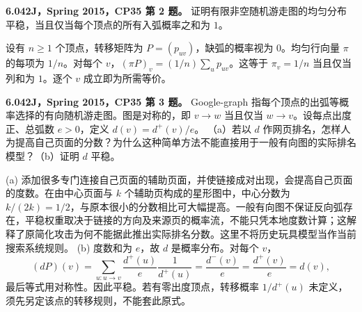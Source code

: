 \begin{exercise}\label{mit:6042-cp35-q2}
\textbf{6.042J，Spring 2015，CP35 第 2 题。}
证明有限非空随机游走图的均匀分布平稳，当且仅当每个顶点的所有入弧概率之和为 $1$。
\end{exercise}
\begin{solution}
设有 $n\ge1$ 个顶点，转移矩阵为 $P=(p_{uv})$，缺弧的概率视为 $0$。均匀行向量 $\pi$ 的每项为 $1/n$。对每个 $v$，$(\pi P)_v=(1/n)\sum_u p_{uv}$。这等于 $\pi_v=1/n$ 当且仅当列和为 $1$。逐个 $v$ 成立即为所需等价。
\end{solution}

\begin{exercise}\label{mit:6042-cp35-q3}
\textbf{6.042J，Spring 2015，CP35 第 3 题。}
Google-graph 指每个顶点的出弧等概率选择的有向随机游走图。图是对称的，即 $v\to w$ 当且仅当 $w\to v$。设每点出度正、总弧数 $e>0$，定义 $d(v)=d^+(v)/e$。
（a）若以 $d$ 作网页排名，怎样人为提高自己页面的分数？为什么这种简单方法不能直接用于一般有向图的实际排名模型？（b）证明 $d$ 平稳。
\end{exercise}
\begin{solution}
(a) 添加很多专门连接自己页面的辅助页面，并使链接成对出现，会提高自己页面的度数。在由中心页面与 $k$ 个辅助页构成的星形图中，中心分数为 $k/(2k)=1/2$，与原本很小的分数相比可大幅提高。一般有向图不保证反向弧存在，平稳权重取决于链接的方向及来源页的概率流，不能只凭本地度数计算；这解释了原简化攻击为何不能据此推出实际排名分数。这里不将历史玩具模型当作当前搜索系统规则。
(b) 度数和为 $e$，故 $d$ 是概率分布。对每个 $v$，
\[
(dP)(v)=\sum_{u:u\to v}\frac{d^+(u)}e\frac1{d^+(u)}
=\frac{d^-(v)}e=\frac{d^+(v)}e=d(v),
\]
最后等式用对称性。因此平稳。若有零出度顶点，转移概率 $1/d^+(u)$ 未定义，须先另定该点的转移规则，不能套此原式。
\end{solution}
